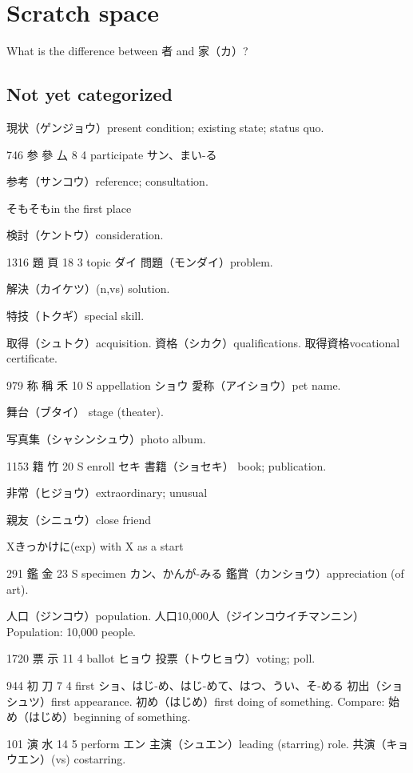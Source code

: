 \chapter{Scratch space}

What is the difference between 者 and 家（カ）?

\section{Not yet categorized}

現状（ゲンジョウ）present condition; existing state; status quo.

746	参	參	厶	8	4		participate	サン、まい-る

参考（サンコウ）reference; consultation.

そもそもin the first place

検討（ケントウ）consideration.

1316	題		頁	18	3		topic	ダイ
問題（モンダイ）problem.

解決（カイケツ）(n,vs) solution.

特技（トクギ）special skill.

取得（シュトク）acquisition.
資格（シカク）qualifications.
取得資格vocational certificate.

979	称	稱	禾	10	S		appellation	ショウ
愛称（アイショウ）pet name.

舞台（ブタイ）
stage (theater).

写真集（シャシンシュウ）photo album.

1153	籍		竹	20	S		enroll	セキ
書籍（ショセキ）
book; publication.

非常（ヒジョウ）extraordinary; unusual

親友（シニュウ）close friend

Xきっかけに(exp) with X as a start

291	鑑		金	23	S		specimen	カン、かんが-みる
鑑賞（カンショウ）appreciation (of art).

人口（ジンコウ）population.
人口10,000人（ジインコウイチマンニン）
Population: 10,000 people.

1720	票		示	11	4		ballot	ヒョウ
投票（トウヒョウ）voting; poll.

944	初		刀	7	4		first	ショ、はじ-め、はじ-めて、はつ、うい、そ-める
初出（ショシュツ）first appearance.
初め（はじめ）first doing of something.
Compare: 始め（はじめ）beginning of something.

101	演		水	14	5		perform	エン
主演（シュエン）leading (starring) role.
共演（キョウエン）(vs) costarring.

